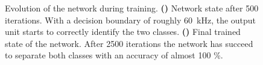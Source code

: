 \begin{figure}
	\begin{subfigure}{\textwidth}
		\caption{}
		\centering
		
		\label{learning_process_s500}
	\end{subfigure}
	\begin{subfigure}{\textwidth}
		\caption{}
		\centering
		
		\label{learning_process_s2500}
	\end{subfigure}
	\caption[Evolution of the network during training.]{Evolution of the network during training. \textbf{()} Network state after 500 iterations. With a decision boundary of roughly \SI{60}{\kilo \Hz}, the output unit starts to correctly identify the two classes. \textbf{()} Final trained state of the network. After 2500 iterations the network has succeed to separate both classes with an accuracy of almost 100 \%.}
\end{figure}

%    
